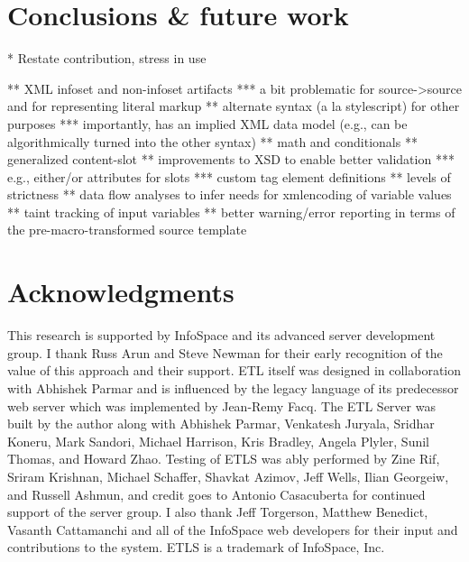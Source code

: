 \documentclass{www2003-submission}
\begin{document}


\section{Conclusions \& future work}

* Restate contribution, stress in use


** XML infoset and non-infoset artifacts
*** a bit problematic for source->source and for representing literal markup
** alternate syntax (a la stylescript) for other purposes
*** importantly, has an implied XML data model (e.g., can be algorithmically turned into the other syntax)
** math and conditionals
** generalized content-slot
** improvements to XSD to enable better validation
*** e.g., either/or attributes for slots
*** custom tag element definitions
** levels of strictness
** data flow analyses to infer needs for xmlencoding of variable values
** taint tracking of input variables
** better warning/error reporting in terms of the pre-macro-transformed source template


\section{Acknowledgments}
This research is supported by InfoSpace and its advanced server
development group.  I thank Russ Arun and Steve Newman for their early
recognition of the value of this approach and their support.  ETL
itself was designed in collaboration with Abhishek Parmar and is
influenced by the legacy language of its predecessor web server which
was implemented by Jean-Remy Facq.  The ETL Server was built by the
author along with Abhishek Parmar, Venkatesh Juryala, Sridhar Koneru,
Mark Sandori, Michael Harrison, Kris Bradley, Angela Plyler, Sunil
Thomas, and Howard Zhao.  Testing of ETLS was ably performed by Zine
Rif, Sriram Krishnan, Michael Schaffer, Shavkat Azimov, Jeff Wells,
Ilian Georgeiw, and Russell Ashmun, and credit goes to Antonio
Casacuberta for continued support of the server group.  I also thank
Jeff Torgerson, Matthew Benedict, Vasanth Cattamanchi and all of the
InfoSpace web developers for their input and contributions to
the system. ETLS is a trademark of InfoSpace, Inc.




%
\appendix
\end{document}
